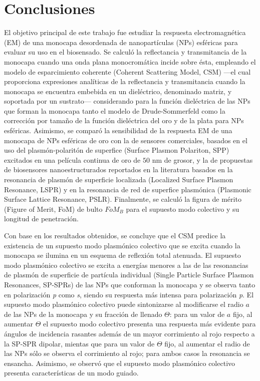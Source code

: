 \chapter*{Conclusiones}
\label{chapter:Conclusiones}

El objetivo principal de este trabajo fue estudiar la respuesta electromagnética (EM) de una monocapa desordenada de nanopartículas (NPs) esféricas para evaluar su uso en el biosensado. Se calculó la  reflectancia y transmitancia de la monocapa cuando una onda plana monocromática incide sobre ésta, empleando el modelo de esparcimiento coherente (Coherent Scattering Model, CSM) \cite{reyes2018analytical,pena-gomar2006coherent,barrera1991optical,garcia2012multiple} ---el cual proporciona expresiones analíticas de la reflectancia y transmitancia cuando la monocapa se encuentra embebida en un dieléctrico, denominado matriz, y soportada por un sustrato--- considerando para  la función dieléctrica de las NPs que forman la monocapa tanto el modelo de Drude-Sommerfeld como  la corrección por tamaño de la función dieléctrica del oro y de la plata para NPs esféricas. Asimismo, se comparó la sensibilidad de la respuesta EM de una monocapa de NPs esféricas de oro con la de sensores comerciales, basados en el uso del plasmón-polaritón de superfice (Surface Plasmon Polariton, SPP)  excitados en una película continua de oro de $50$ nm de grosor, y la de propuestas de biosensores nanoestructurados reportados en la literatura \cite{svedendahl2009refractometric,kabashin2009plasmonic,danilov2018ultra} basados en la resonancia de plasmón de superficie localizada (Localized Surface Plasmon Resonance, LSPR) y en la resonancia de red de superfice plasmónica (Plasmonic Surface Lattice Resonance, PSLR). Finalmente, se calculó la figura de mérito (Figure of Merit, FoM) de bulto $\textit{FoM}_B$ para el supuesto modo colectivo y su longitud de penetración.

Con base en los resultados obtenidos, se concluye que el  CSM predice la existencia de un supuesto modo plasmónico colectivo que se excita cuando la monocapa se ilumina en un esquema de reflexión total atenuada. El supuesto modo plasmónico colectivo se excita a energías menores a las de las resonancias de plasmón de superficie de partícula individual (Single Particle Surface Plasmon Resonances, SP-SPRs) de las NPs que conforman la monocapa y se observa tanto en polarización \emph{p} como \emph{s}, siendo su respuesta más intensa para polarización \emph{p}. El supuesto modo plasmónico colectivo puede sintonizarse al modificarse el radio $a$ de las NPs de la monocapa y su fracción de llenado $\Theta$: para un valor de $a$ fijo, al aumentar $\Theta$ el supuesto modo colectivo presenta una respuesta más evidente para ángulos de incidencia rasantes además de un mayor corrimiento al rojo respecto a la SP-SPR dipolar, mientas que para un valor de $\Theta$ fijo, al aumentar el radio de las NPs sólo se observa el corrimiento al rojo; para ambos casos la resonancia se ensancha. Asimismo, se observó que el supuesto modo plasmónico colectivo presenta características de un modo guiado.

